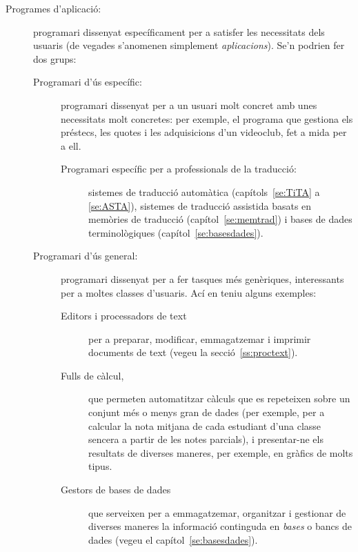 \begin{description}
\item[Programes d'aplicació:] programari dissenyat específicament per
  a satisfer les necessitats dels usuaris (de vegades s'anomenen
  simplement {\em aplicacions}). Se'n podrien fer dos grups:
  \begin{description}
  \item[Programari d'ús específic:] programari dissenyat per a
    un usuari molt concret amb unes necessitats molt concretes:
    per exemple, el programa que gestiona els préstecs, les
    quotes i les adquisicions d'un videoclub, fet a mida per a
    ell.
    \begin{description}
    \item[Programari específic per a professionals de la
      traducció:] sistemes de traducció automàtica
      (capítols~\ref{se:TiTA} a \ref{se:ASTA}), sistemes de
      traducció assistida basats en memòries de traducció
      (capítol~\ref{se:memtrad}) i bases de dades
      terminològiques (capítol~\ref{se:basesdades}).
    \end{description}
  \item[Programari d'ús general:] programari dissenyat per a fer
    tasques més genèriques, interessants per a moltes classes
    d'usuaris. Ací en teniu alguns exemples:
    \begin{description}
    \item[Editors i processadors de text] per a preparar,
      modificar, emmagatzemar i imprimir documents de text
      (vegeu la secció~\ref{ss:proctext}).
    \item[Fulls de càlcul,] que permeten automatitzar
      càlculs que es repeteixen sobre un conjunt més o
      menys gran de dades (per exemple, per a calcular la
      nota mitjana de cada estudiant d'una classe sencera
      a partir de les notes parcials), i presentar-ne els
      resultats de diverses maneres, per exemple, en
      gràfics de molts tipus.
    \item[Gestors de bases de dades] \label{pg:BD} que
      serveixen per a emmagatzemar, organitzar i gestionar
      de diverses maneres la informació continguda en
      \emph{bases} o bancs de dades (vegeu el
      capítol~\ref{se:basesdades}).

\end{description}
\end{description}
\end{description}
